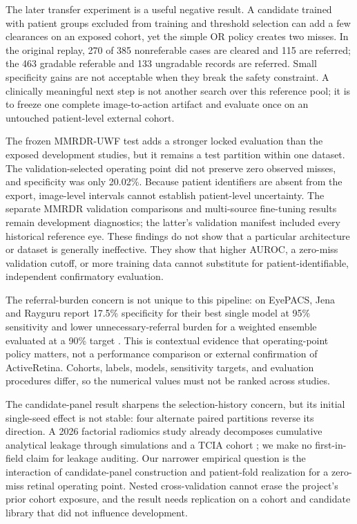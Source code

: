 \documentclass[11pt]{article}
\begin{document}
The later transfer experiment is a useful negative result. A candidate trained with patient groups excluded from training and threshold selection can add a few clearances on an exposed cohort, yet the simple OR policy creates two misses. In the original replay, 270 of 385 nonreferable cases are cleared and 115 are referred; the 463 gradable referable and 133 ungradable records are referred. Small specificity gains are not acceptable when they break the safety constraint. A clinically meaningful next step is not another search over this reference pool; it is to freeze one complete image-to-action artifact and evaluate once on an untouched patient-level external cohort.

The frozen MMRDR-UWF test adds a stronger locked evaluation than the exposed development studies, but it remains a test partition within one dataset. The validation-selected operating point did not preserve zero observed misses, and specificity was only 20.02\%. Because patient identifiers are absent from the export, image-level intervals cannot establish patient-level uncertainty. The separate MMRDR validation comparisons and multi-source fine-tuning results remain development diagnostics; the latter's validation manifest included every historical reference eye. These findings do not show that a particular architecture or dataset is generally ineffective. They show that higher AUROC, a zero-miss validation cutoff, or more training data cannot substitute for patient-identifiable, independent confirmatory evaluation.

The referral-burden concern is not unique to this pipeline: on EyePACS, Jena and Rayguru report 17.5\% specificity for their best single model at 95\% sensitivity and lower unnecessary-referral burden for a weighted ensemble evaluated at a 90\% target \cite{jena2026}. This is contextual evidence that operating-point policy matters, not a performance comparison or external confirmation of ActiveRetina. Cohorts, labels, models, sensitivity targets, and evaluation procedures differ, so the numerical values must not be ranked across studies.

The candidate-panel result sharpens the selection-history concern, but its initial single-seed effect is not stable: four alternate paired partitions reverse its direction. A 2026 factorial radiomics study already decomposes cumulative analytical leakage through simulations and a TCIA cohort \cite{garciahidalgo2026}; we make no first-in-field claim for leakage auditing. Our narrower empirical question is the interaction of candidate-panel construction and patient-fold realization for a zero-miss retinal operating point. Nested cross-validation cannot erase the project's prior cohort exposure, and the result needs replication on a cohort and candidate library that did not influence development.
\end{document}
